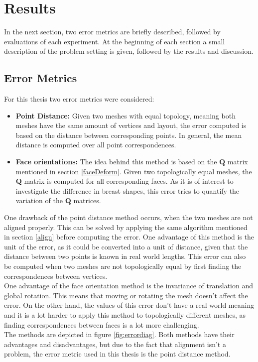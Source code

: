 \chapter{Results}
In the next section, two error metrics are briefly described, followed by evaluations of each experiment. At the beginning of each section a small description of the problem setting is given, followed by the results and discussion.

\section{Error Metrics}
\label{Emetrics}
For this thesis two error metrics were considered:
\begin{itemize}
  \item \textbf{Point Distance:} Given two meshes with equal topology, meaning both meshes have the same amount of vertices and layout, the error computed is based on the distance between corresponding points. In general, the mean distance is computed over all point correspondences.
  \item \textbf{Face orientations:} The idea behind this method is based on the $\mathbf{Q}$ matrix mentioned in section \ref{faceDeform}. Given two topologically equal meshes, the $\mathbf{Q}$ matrix is computed for all corresponding faces. As it is of interest to investigate the difference in breast shapes, this error tries to quantify the variation of the $\mathbf{Q}$ matrices.
\end{itemize}

One drawback of the point distance method occurs, when the two meshes are not aligned properly. This can be solved by applying the same algorithm mentioned in section \ref{align} before computing the error. One advantage of this method is the unit of the error, as it could be converted into a unit of distance, given that the distance between two points is known in real world lengths. This error can also be computed when two meshes are not topologically equal by first finding the correspondences between vertices.\\
One advantage of the face orientation method is the invariance of translation and global rotation. This means that moving or rotating the mesh doesn't affect the error. On the other hand, the values of this error don't have a real world meaning and it is a lot harder to apply this method to topologically different meshes, as finding correspondences between faces is a lot more challenging.\\
The methods are depicted in figure \ref{fig:errordiag}. Both methods have their advantages and disadvantages, but due to the fact that alignment isn't a problem, the error metric used in this thesis is the point distance method.

